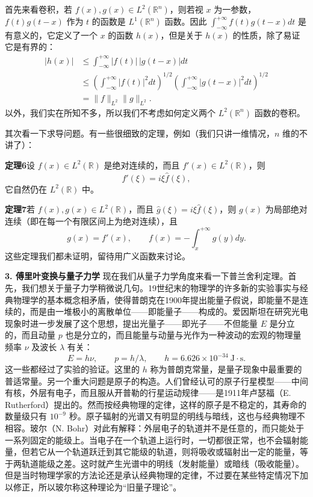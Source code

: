 首先来看卷积，若 $f(x),g(x)\in L^2(\mathbb R^n)$，则若视 $x$ 为一参数，$f(t)g(t-x)$ 作为 $t$ 的函数是 $L^1(\mathbb R^n)$ 函数。因此 $\int_{-\infty}^{+\infty}f(t)g(t-x)dt$ 是有意义的，它定义了一个 $x$ 的函数 $h(x)$，但是关于 $h(x)$ 的性质，除了易证它是有界的：
\[
\begin{aligned}
 |h(x)|&\le\int_{-\infty}^{+\infty}|f(t)|\,|g(t-x)|dt\\
 &\le\left(\int_{-\infty}^{+\infty}|f(t)|^2dt\right)^{1/2}
 \left(\int_{-\infty}^{+\infty}|g(t-x)|^2dt\right)^{1/2}\\
 &=\|f\|_{L^2}\|g\|_{L^2}.
\end{aligned}
\]
以外，我们实在所知不多，所以我们不考虑如何定义两个 $L^2(\mathbb R^n)$ 函数的卷积。

其次看一下求导问题。有一些很细致的定理，例如（我们只讲一维情况，$n$ 维的不讲了）：

\noindent\textbf{定理6}\quad 设 $f(x)\in L^2(\mathbb R)$ 是绝对连续的，而且 $f'(x)\in L^2(\mathbb R)$，则
\[
 \widehat{f'}(\xi)=i\xi\widehat f(\xi),
\]
它自然仍在 $L^2(\mathbb R)$ 中。

\noindent\textbf{定理7}\quad 若 $f(x),g(x)\in L^2(\mathbb R)$，而且 $\widehat g(\xi)=i\xi\widehat f(\xi)$，则 $g(x)$ 为局部绝对连续（即在每一个有限区间上为绝对连续），且
\[
 g(x)=f'(x),\qquad f(x)=-\int_x^{+\infty}g(y)dy.
\]
这些定理我们都未证明，留待用广义函数来讨论。

\noindent\textbf{3. 傅里叶变换与量子力学}\quad
现在我们从量子力学角度来看一下普兰舍利定理。首先，我们想关于量子力学稍微说几句。19世纪末的物理学的许多新的实验事实与经典物理学的基本概念相矛盾，使得普朗克在1900年提出能量子假说，即能量不是连续的，而是由一堆极小的离散单位——即能量子——构成的。爱因斯坦在研究光电现象时进一步发展了这个思想，提出光量子——即光子——不但能量 $E$ 是分立的，而且动量 $p$ 也是分立的，而且能量与动量与光作为一种波动的宏观的物理量频率 $\nu$ 及波长 $\lambda$ 有关：
\[
 E=h\nu,\qquad p=h/\lambda,\qquad h=6.626\times10^{-34}\ \mathrm{J\cdot s}.
\]
这一些都经过了实验的验证。这里的 $h$ 称为普朗克常量，是量子现象中最重要的普适常量。另一个重大问题是原子的构造。人们曾经认可的原子行星模型——中间有核，外层有电子，而且服从开普勒的行星运动规律——是1911年卢瑟福（E. Rutherford）提出的。然而按经典物理的定律，这样的原子是不稳定的，其寿命的数量级只有 $10^{-9}$ 秒。原子辐射的光谱又有明显的明线与暗线，这也与经典物理不相容。玻尔（N. Bohr）对此有解释：外层电子的轨道并不是任意的，而只能处于一系列固定的能级上。当电子在一个轨道上运行时，一切都很正常，也不会辐射能量，但若它从一个轨道跃迁到其它能级的轨道，则将吸收或辐射出一定的能量，等于两轨道能级之差。这时就产生光谱中的明线（发射能量）或暗线（吸收能量）。但是当时物理学家的方法论还是承认经典物理的定律，不过要在某些特定情况下加以修正，所以玻尔称这种理论为“旧量子理论”。

